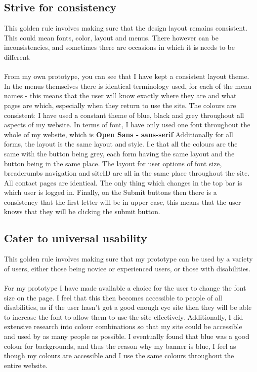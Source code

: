 \documentclass{article}
\begin{document}
\subsection{Strive for consistency}
This golden rule involves making sure that the design layout remains consistent. This could mean fonts, color, layout and menus. There however can be inconsistencies, and sometimes there are occasions in which it is needs to be different. 
\\ \\
From my own prototype, you can see that I have kept a consistent layout theme. In the menus themselves there is identical terminology used, for each of the menu names - this means that the user will know exactly where they are and what pages are which, especially when they return to use the site. The colours are consistent: I have used a constant theme of blue, black and grey throughout all aspects of my website. In terms of font, I have only used one font throughout the whole of my website, which is \textbf{Open Sans - sans-serif} Additionally for all forms, the layout is the same layout and style. I.e that all the colours are the same with the button being grey, each form having the same layout and the button being in the same place.
The layout for user options of font size, breadcrumbs navigation and siteID are all in the same place throughout the site. All contact pages are identical. The only thing which changes in the top bar is which user is logged in. Finally, on the Submit buttons then there is a consistency that the first letter will be in upper case, this means that the user knows that they will be clicking the submit button.
\subsection{Cater to universal usability}
This golden rule involves making sure that my prototype can be used by a variety of users, either those being novice or experienced users, or those with disabilities.
\\ \\
For my prototype I have made available a choice for the user to change the font size on the page. I feel that this then becomes accessible to people of all disabilities, as if the user hasn't got a good enough eye site then they will be able to increase the font to allow them to use the site effectively. Additionally, I did extensive research into colour combinations so that my site could be accessible and used by as many people as possible. I eventually found that blue was a good colour for backgrounds, and thus the reason why my banner is blue, I feel as though my colours are accessible and I use the same colours throughout the entire website.
\end{document}
